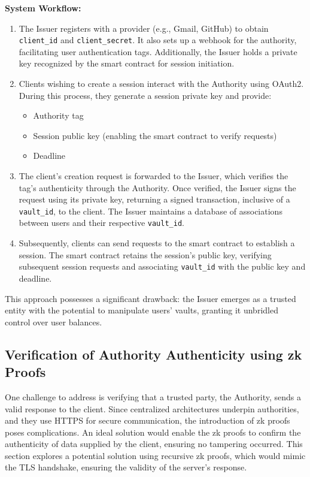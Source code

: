 \documentclass{article}
\begin{document}
\textbf{System Workflow:}
\begin{enumerate}
    \item The Issuer registers with a provider (e.g., Gmail, GitHub) to obtain \texttt{client\_id} and \texttt{client\_secret}. It also sets up a webhook for the authority, facilitating user authentication tags. Additionally, the Issuer holds a private key recognized by the smart contract for session initiation.
    \item Clients wishing to create a session interact with the Authority using OAuth2. During this process, they generate a session private key and provide:
    \begin{itemize}
        \item Authority tag
        \item Session public key (enabling the smart contract to verify requests)
        \item Deadline
    \end{itemize}
    \item The client's creation request is forwarded to the Issuer, which verifies the tag's authenticity through the Authority. Once verified, the Issuer signs the request using its private key, returning a signed transaction, inclusive of a \texttt{vault\_id}, to the client. The Issuer maintains a database of associations between users and their respective \texttt{vault\_id}.
    \item Subsequently, clients can send requests to the smart contract to establish a session. The smart contract retains the session's public key, verifying subsequent session requests and associating \texttt{vault\_id} with the public key and deadline.
\end{enumerate}

This approach possesses a significant drawback: the Issuer emerges as a trusted entity with the potential to manipulate users' vaults, granting it unbridled control over user balances.

\subsection{Verification of Authority Authenticity using zk Proofs}

One challenge to address is verifying that a trusted party, the Authority, sends a valid response to the client. Since centralized architectures underpin authorities, and they use HTTPS for secure communication, the introduction of zk proofs poses complications. An ideal solution would enable the zk proofs to confirm the authenticity of data supplied by the client, ensuring no tampering occurred. This section explores a potential solution using recursive zk proofs, which would mimic the TLS handshake, ensuring the validity of the server's response.
\end{document}
